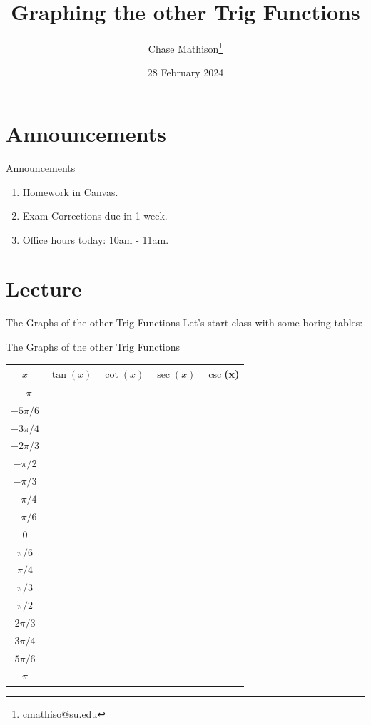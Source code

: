 \documentclass[presentation,10pt]{beamer}
\institute[SU]{Shenandoah University}
\author{Chase Mathison\thanks{cmathiso@su.edu}}
\date{28 February 2024}
\title{Graphing the other Trig Functions}
\begin{document}
\maketitle

\section{Announcements}
\label{sec:orgda88200}
\begin{frame}[label={sec:org0c28fdf}]{Announcements}
\begin{enumerate}
\item Homework in Canvas.
\item Exam Corrections due in 1 week.
\item Office hours today: 10am - 11am.
\end{enumerate}
\end{frame}

\section{Lecture}
\label{sec:org12ba74a}
\begin{frame}[label={sec:orgd7dc76d}]{The Graphs of the other Trig Functions}
Let's start class with some boring tables:
\end{frame}

\begin{frame}[label={sec:orgacc7cb7}]{The Graphs of the other Trig Functions}
\begin{center}
\begin{tabular}{|c|c|c|c|c|}
\hline
\(x\) & \(\tan(x)\) & \(\cot(x)\) & \(\sec(x)\) & \(\csc\)(x)\\[0pt]
\hline
\(-\pi\) &  &  &  & \\[0pt]
\hline
\(-5\pi/6\) &  &  &  & \\[0pt]
\hline
\(-3\pi/4\) &  &  &  & \\[0pt]
\hline
\(-2\pi/3\) &  &  &  & \\[0pt]
\hline
\(-\pi/2\) &  &  &  & \\[0pt]
\hline
\(-\pi/3\) &  &  &  & \\[0pt]
\hline
\(-\pi/4\) &  &  &  & \\[0pt]
\hline
\(-\pi/6\) &  &  &  & \\[0pt]
\hline
0 &  &  &  & \\[0pt]
\hline
\(\pi/6\) &  &  &  & \\[0pt]
\hline
\(\pi/4\) &  &  &  & \\[0pt]
\hline
\(\pi/3\) &  &  &  & \\[0pt]
\hline
\(\pi/2\) &  &  &  & \\[0pt]
\hline
\(2\pi/3\) &  &  &  & \\[0pt]
\hline
\(3\pi/4\) &  &  &  & \\[0pt]
\hline
\(5\pi/6\) &  &  &  & \\[0pt]
\hline
\(\pi\) &  &  &  & \\[0pt]
\hline
\end{tabular}
\end{center}
\end{frame}
\end{document}
